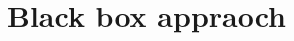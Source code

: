 \documentclass[../main]{subfiles}
\begin{document}
\chapter{Black box appraoch}
\label{ch:reserach_question2}


\end{document}
